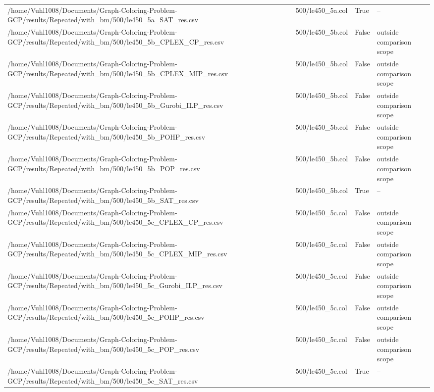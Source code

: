 \begin{table}[htbp]
\begin{tabular}{llll}
/home/Vuhl1008/Documents/Graph-Coloring-Problem-GCP/results/Repeated/with\_bm/500/le450\_5a\_SAT\_res.csv & 500/le450\_5a.col & True & -- \\
/home/Vuhl1008/Documents/Graph-Coloring-Problem-GCP/results/Repeated/with\_bm/500/le450\_5b\_CPLEX\_CP\_res.csv & 500/le450\_5b.col & False & outside comparison scope \\
/home/Vuhl1008/Documents/Graph-Coloring-Problem-GCP/results/Repeated/with\_bm/500/le450\_5b\_CPLEX\_MIP\_res.csv & 500/le450\_5b.col & False & outside comparison scope \\
/home/Vuhl1008/Documents/Graph-Coloring-Problem-GCP/results/Repeated/with\_bm/500/le450\_5b\_Gurobi\_ILP\_res.csv & 500/le450\_5b.col & False & outside comparison scope \\
/home/Vuhl1008/Documents/Graph-Coloring-Problem-GCP/results/Repeated/with\_bm/500/le450\_5b\_POHP\_res.csv & 500/le450\_5b.col & False & outside comparison scope \\
/home/Vuhl1008/Documents/Graph-Coloring-Problem-GCP/results/Repeated/with\_bm/500/le450\_5b\_POP\_res.csv & 500/le450\_5b.col & False & outside comparison scope \\
/home/Vuhl1008/Documents/Graph-Coloring-Problem-GCP/results/Repeated/with\_bm/500/le450\_5b\_SAT\_res.csv & 500/le450\_5b.col & True & -- \\
/home/Vuhl1008/Documents/Graph-Coloring-Problem-GCP/results/Repeated/with\_bm/500/le450\_5c\_CPLEX\_CP\_res.csv & 500/le450\_5c.col & False & outside comparison scope \\
/home/Vuhl1008/Documents/Graph-Coloring-Problem-GCP/results/Repeated/with\_bm/500/le450\_5c\_CPLEX\_MIP\_res.csv & 500/le450\_5c.col & False & outside comparison scope \\
/home/Vuhl1008/Documents/Graph-Coloring-Problem-GCP/results/Repeated/with\_bm/500/le450\_5c\_Gurobi\_ILP\_res.csv & 500/le450\_5c.col & False & outside comparison scope \\
/home/Vuhl1008/Documents/Graph-Coloring-Problem-GCP/results/Repeated/with\_bm/500/le450\_5c\_POHP\_res.csv & 500/le450\_5c.col & False & outside comparison scope \\
/home/Vuhl1008/Documents/Graph-Coloring-Problem-GCP/results/Repeated/with\_bm/500/le450\_5c\_POP\_res.csv & 500/le450\_5c.col & False & outside comparison scope \\
/home/Vuhl1008/Documents/Graph-Coloring-Problem-GCP/results/Repeated/with\_bm/500/le450\_5c\_SAT\_res.csv & 500/le450\_5c.col & True & -- \\

\end{tabular}
\end{table}
